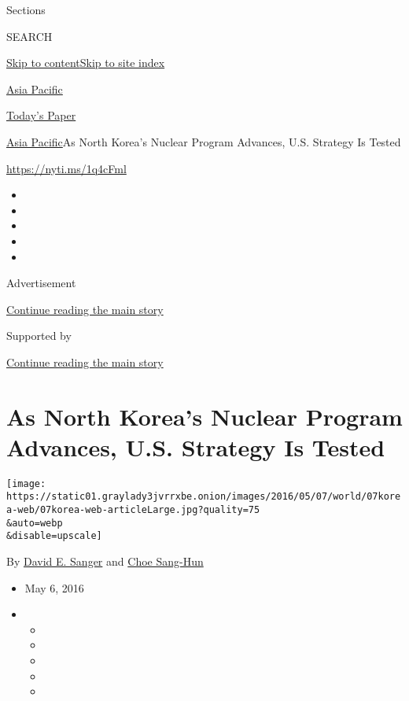 Sections

SEARCH

\protect\hyperlink{site-content}{Skip to
content}\protect\hyperlink{site-index}{Skip to site index}

\href{https://www.nytimes3xbfgragh.onion/section/world/asia}{Asia
Pacific}

\href{https://myaccount.nytimes3xbfgragh.onion/auth/login?response_type=cookie\&client_id=vi}{}

\href{https://www.nytimes3xbfgragh.onion/section/todayspaper}{Today's
Paper}

\href{/section/world/asia}{Asia Pacific}\textbar{}As North Korea's
Nuclear Program Advances, U.S. Strategy Is Tested

\url{https://nyti.ms/1q4cFml}

\begin{itemize}
\item
\item
\item
\item
\item
\end{itemize}

Advertisement

\protect\hyperlink{after-top}{Continue reading the main story}

Supported by

\protect\hyperlink{after-sponsor}{Continue reading the main story}

\hypertarget{as-north-koreas-nuclear-program-advances-us-strategy-is-tested}{%
\section{As North Korea's Nuclear Program Advances, U.S. Strategy Is
Tested}\label{as-north-koreas-nuclear-program-advances-us-strategy-is-tested}}

\texttt{[image: https://static01.graylady3jvrrxbe.onion/images/2016/05/07/world/07korea-web/07korea-web-articleLarge.jpg?quality=75\\\&auto=webp\\\&disable=upscale]}

By \href{http://www.nytimes3xbfgragh.onion/by/david-e-sanger}{David E.
Sanger} and
\href{http://www.nytimes3xbfgragh.onion/by/choe-sang-hun}{Choe Sang-Hun}

\begin{itemize}
\item
  May 6, 2016
\item
  \begin{itemize}
  \item
  \item
  \item
  \item
  \item
  \end{itemize}
\end{itemize}

